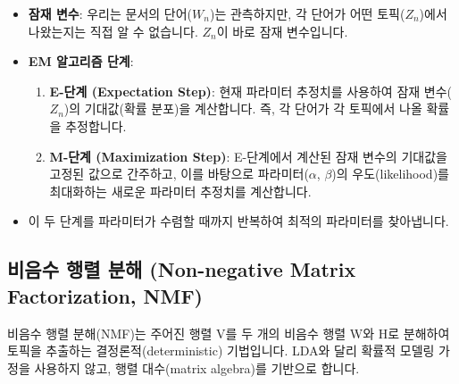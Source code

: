 \documentclass[11pt,a4paper]{article}
\begin{document}
\begin{itemize}
    \item \textbf{잠재 변수}: 우리는 문서의 단어($W_n$)는 관측하지만, 각 단어가 어떤 토픽($Z_n$)에서 나왔는지는 직접 알 수 없습니다. $Z_n$이 바로 잠재 변수입니다.
    \item \textbf{EM 알고리즘 단계}:
    \begin{enumerate}
        \item \textbf{E-단계 (Expectation Step)}: 현재 파라미터 추정치를 사용하여 잠재 변수($Z_n$)의 기대값(확률 분포)을 계산합니다. 즉, 각 단어가 각 토픽에서 나올 확률을 추정합니다.
        \item \textbf{M-단계 (Maximization Step)}: E-단계에서 계산된 잠재 변수의 기대값을 고정된 값으로 간주하고, 이를 바탕으로 파라미터($\alpha$, $\beta$)의 우도(likelihood)를 최대화하는 새로운 파라미터 추정치를 계산합니다.
    \end{enumerate}
    \item 이 두 단계를 파라미터가 수렴할 때까지 반복하여 최적의 파라미터를 찾아냅니다.
\end{itemize}

\newpage
\subsection*{비음수 행렬 분해 (Non-negative Matrix Factorization, NMF)}
\begin{conceptbox}
비음수 행렬 분해(NMF)는 주어진 행렬 V를 두 개의 비음수 행렬 W와 H로 분해하여 토픽을 추출하는 결정론적(deterministic) 기법입니다.
LDA와 달리 확률적 모델링 가정을 사용하지 않고, 행렬 대수(matrix algebra)를 기반으로 합니다.
\end{conceptbox}
\end{document}
